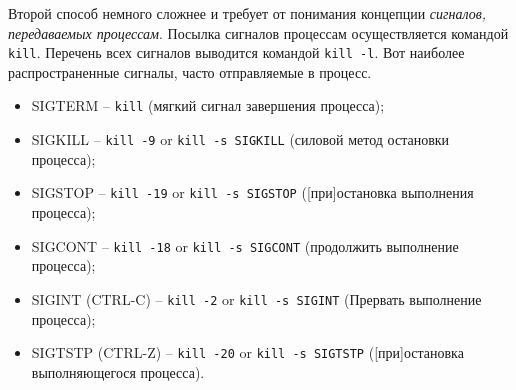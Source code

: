 \documentclass[12pt]{article}
\providecommand{\tightlist}{%
  \setlength{\itemsep}{0pt}\setlength{\parskip}{0pt}}
\begin{document}
Второй способ немного сложнее и требует от понимания концепции
\emph{сигналов, передаваемых процессам}. Посылка сигналов процессам
осуществляется командой \texttt{kill}. Перечень всех сигналов выводится
командой \texttt{kill\ -l}. Вот наиболее распространенные
сигналы, часто отправляемые в процесс.
\begin{itemize}
\tightlist
\item
  SIGTERM -- \texttt{kill} (мягкий сигнал завершения процесса);
\item
  SIGKILL -- \texttt{kill\ -9} or \texttt{kill\ -s\ SIGKILL} (силовой
  метод остановки процесса);
\item
  SIGSTOP -- \texttt{kill\ -19} or \texttt{kill\ -s\ SIGSTOP}
  ({[}при{]}остановка выполнения процесса);
\item
  SIGCONT -- \texttt{kill\ -18} or \texttt{kill\ -s\ SIGCONT} (продолжить
  выполнение процесса);
\item
  SIGINT (CTRL-C) -- \texttt{kill\ -2} or \texttt{kill\ -s\ SIGINT}
  (Прервать выполнение процесса);
\item
  SIGTSTP (CTRL-Z) -- \texttt{kill\ -20} or \texttt{kill\ -s\ SIGTSTP}
  ({[}при{]}остановка выполняющегося процесса).
\end{itemize}
\end{document}
